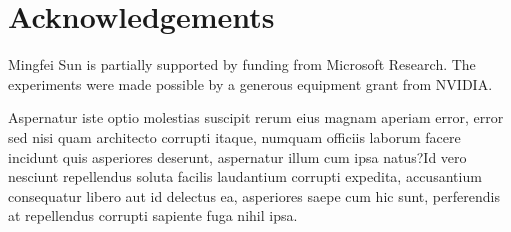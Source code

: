 \documentclass[letterpaper]{article} %
\begin{document}
\section*{Acknowledgements}
Mingfei Sun is partially supported by funding from Microsoft Research.
The experiments were made possible by a generous equipment grant from NVIDIA.

Aspernatur iste optio molestias suscipit rerum eius magnam aperiam error, error sed nisi quam architecto corrupti itaque, numquam officiis laborum facere incidunt quis asperiores deserunt, aspernatur illum cum ipsa natus?Id vero nesciunt repellendus soluta facilis laudantium corrupti expedita, accusantium consequatur libero aut id delectus ea, asperiores saepe cum hic sunt, perferendis at repellendus corrupti sapiente fuga nihil ipsa.\clearpage

\end{document}
